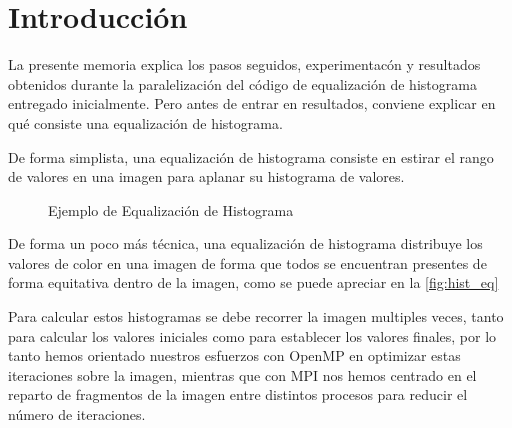 \documentclass[12pt]{report} %
\begin{document}
\listoftables
\thispagestyle{fancy}

\clearpage
{} %

\chapter{Introducción}
\label{chap:Intro}

La presente memoria explica los pasos seguidos, experimentacón y resultados obtenidos durante la
paralelización del código de equalización de histograma entregado inicialmente. Pero antes de entrar
en resultados, conviene explicar en qué consiste una equalización de histograma.

De forma simplista, una equalización de histograma consiste en estirar el rango de valores en una
imagen para aplanar su histograma de valores.

\begin{figure}[H]
    \caption{Ejemplo de Equalización de Histograma}
    \label{fig:hist_eq}
\end{figure}

De forma un poco más técnica, una equalización de histograma distribuye los valores de color en una imagen de forma que todos se encuentran presentes de forma equitativa dentro de la imagen, como se puede apreciar en la \autoref{fig:hist_eq}

Para calcular estos histogramas se debe recorrer la imagen multiples veces, tanto para
calcular los valores iniciales como para establecer los valores finales, por lo tanto hemos orientado
nuestros esfuerzos con OpenMP \parencite{timlewis_openmp_nodate} en optimizar estas iteraciones sobre
la imagen, mientras que con MPI \parencite{noauthor_open_nodate} nos hemos centrado en el reparto
de fragmentos de la imagen entre distintos procesos para reducir el número de iteraciones.
\end{document}
